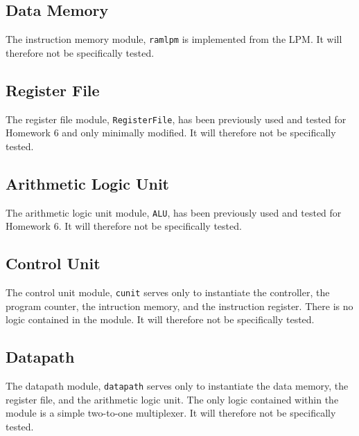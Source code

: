 \subsection{Data Memory} %
\label{sub:data_memory}

The instruction memory module, \verb|ramlpm| is implemented from the LPM.
It will therefore not be specifically tested.

\subsection{Register File} %
\label{sub:register_file}

The register file module, \verb|RegisterFile|, has been previously used and tested for Homework 6 and only minimally modified.
It will therefore not be specifically tested.

\subsection{Arithmetic Logic Unit} %
\label{sub:arithmetic_logic_unit}

The arithmetic logic unit module, \verb|ALU|, has been previously used and tested for Homework 6.
It will therefore not be specifically tested.

\subsection{Control Unit} %
\label{sub:control_unit_pro}

The control unit module, \verb|cunit| serves only to instantiate the controller, the program counter, the intruction memory, and the instruction register.
There is no logic contained in the module.
It will therefore not be specifically tested.


\subsection{Datapath} %
\label{sub:datapath_pro}

The datapath module, \verb|datapath| serves only to instantiate the data memory, the register file, and the arithmetic logic unit.
The only logic contained within the module is a simple two-to-one multiplexer.
It will therefore not be specifically tested.


